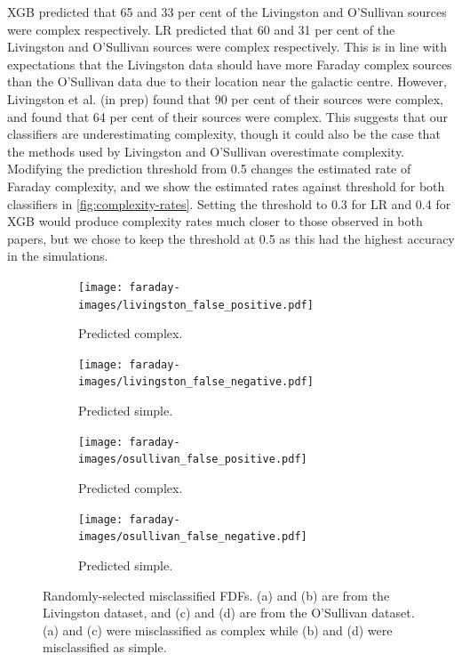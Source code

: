     XGB predicted that 65 and 33 per cent of the Livingston and O'Sullivan sources were complex respectively. LR predicted that 60 and 31 per cent of the Livingston and O'Sullivan sources were complex respectively. This is in line with expectations that the Livingston data should have more Faraday complex sources than the O'Sullivan data due to their location near the galactic centre. However, Livingston et al. (in prep) found that 90 per cent of their sources were complex, and \citet{osullivan_broad-band_2017} found that 64 per cent of their sources were complex. This suggests that our classifiers are underestimating complexity, though it could also be the case that the methods used by Livingston and O'Sullivan overestimate complexity. Modifying the prediction threshold from 0.5 changes the estimated rate of Faraday complexity, and we show the estimated rates against threshold for both classifiers in \autoref{fig:complexity-rates}. Setting the threshold to 0.3 for LR and 0.4 for XGB would produce complexity rates much closer to those observed in both papers, but we chose to keep the threshold at 0.5 as this had the highest accuracy in the simulations.

    \begin{figure}
      \centering
      \begin{subfigure}{0.45\linewidth}
        \texttt{[image: faraday-images/livingston\_false\_positive.pdf]}
        \caption{Predicted complex.}
        \label{fig:faraday-livingston-false-positive}
      \end{subfigure}%
      \begin{subfigure}{0.45\linewidth}
        \texttt{[image: faraday-images/livingston\_false\_negative.pdf]}
        \caption{Predicted simple.}
        \label{fig:faraday-livingston-false-negative}
      \end{subfigure}
      \begin{subfigure}{0.45\linewidth}
        \texttt{[image: faraday-images/osullivan\_false\_positive.pdf]}
        \caption{Predicted complex.}
      \end{subfigure}%
      \begin{subfigure}{0.45\linewidth}
        \texttt{[image: faraday-images/osullivan\_false\_negative.pdf]}
        \caption{Predicted simple.}
      \end{subfigure}
      \caption{Randomly-selected misclassified FDFs. (a) and (b) are from the Livingston dataset, and (c) and (d) are from the O'Sullivan dataset. (a) and (c) were misclassified as complex while (b) and (d) were misclassified as simple.}
      \label{fig:faraday-misclassified}
    \end{figure}

